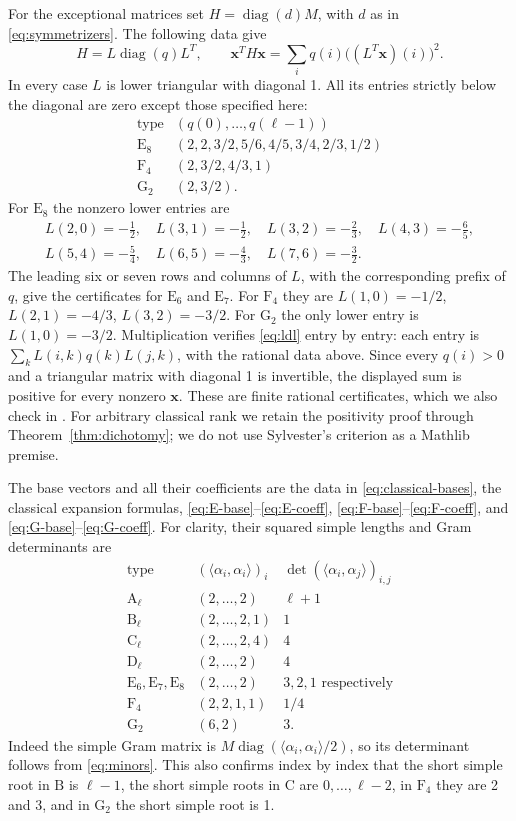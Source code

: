 \documentclass[11pt]{amsart}
\newcommand\Zx{{\mathbf x}}
\newcommand\opk[1]{\mathop{\mathrm{#1}}\nolimits}
\newcommand\ip[2]{\langle#1,#2\rangle}
\theoremstyle{definition}
\newcommand{\typ}[1]{\mathrm{#1}}
\DeclareRobustCommand{\ml}[1]{\ifmmode\text{\normalfont\small\ttfamily\detokenize{#1}}\else{\normalfont\small\nolinkurl{#1}}\fi}
\newcommand{\lsq}[1]{\ip{#1}{#1}}
\begin{document}
For the exceptional matrices set $H=\opk{diag}(d)M$, with $d$ as in
\eqref{eq:symmetrizers}. The following data give
\begin{equation}\label{eq:ldl}
 H=L\opk{diag}(q)L^T,\qquad
 \Zx^TH\Zx=\sum_i q(i)\bigl((L^T\Zx)(i)\bigr)^2.
\end{equation}
In every case $L$ is lower triangular with diagonal 1. All its entries
strictly below the diagonal are zero except those specified here:
\[
\begin{array}{c|l}
\text{type}&(q(0),\ldots,q(\ell-1))\\\hline
\typ E_8&(2,2,3/2,5/6,4/5,3/4,2/3,1/2)\\
\typ F_4&(2,3/2,4/3,1)\\
\typ G_2&(2,3/2).
\end{array}
\]
For $\typ E_8$ the nonzero lower entries are
\[
\begin{gathered}
 L(2,0)=-\tfrac12,\quad L(3,1)=-\tfrac12,\quad
 L(3,2)=-\tfrac23,\quad L(4,3)=-\tfrac65,\\
 L(5,4)=-\tfrac54,\quad L(6,5)=-\tfrac43,\quad
 L(7,6)=-\tfrac32.
\end{gathered}
\]
The leading six or seven rows and columns of $L$, with the corresponding
prefix of $q$, give the certificates for $\typ E_6$ and $\typ E_7$.
For $\typ F_4$ they are
$L(1,0)=-1/2$, $L(2,1)=-4/3$, $L(3,2)=-3/2$.
For $\typ G_2$ the only lower entry is $L(1,0)=-3/2$.
Multiplication verifies \eqref{eq:ldl} entry by entry: each entry is
$\sum_k L(i,k)q(k)L(j,k)$, with the rational data above. Since every
$q(i)>0$ and a triangular matrix with diagonal 1 is invertible,
the displayed sum is positive for every nonzero $\Zx$.
These are finite rational certificates, which we also check in
\ml{checks/affine.py}. For arbitrary classical rank we retain the
positivity proof through Theorem~\ref{thm:dichotomy}; we do not use
Sylvester's criterion as a Mathlib premise.

The base vectors and all their coefficients are the data in
\eqref{eq:classical-bases}, the classical expansion formulas,
\eqref{eq:E-base}--\eqref{eq:E-coeff},
\eqref{eq:F-base}--\eqref{eq:F-coeff}, and
\eqref{eq:G-base}--\eqref{eq:G-coeff}. For clarity, their squared simple
lengths and Gram determinants are
\[
\begin{array}{c|c|c}
\text{type}&(\lsq{\alpha_i})_i&\det(\ip{\alpha_i}{\alpha_j})_{i,j}\\\hline
\typ A_\ell&(2,\ldots,2)&\ell+1\\
\typ B_\ell&(2,\ldots,2,1)&1\\
\typ C_\ell&(2,\ldots,2,4)&4\\
\typ D_\ell&(2,\ldots,2)&4\\
\typ E_6,\typ E_7,\typ E_8&(2,\ldots,2)&3,2,1\text{ respectively}\\
\typ F_4&(2,2,1,1)&1/4\\
\typ G_2&(6,2)&3.
\end{array}
\]
Indeed the simple Gram matrix is
$M\opk{diag}(\lsq{\alpha_i}/2)$, so its determinant follows from
\eqref{eq:minors}. This also confirms index by index that the short
simple root in $\typ B$ is $\ell-1$, the short simple roots in
$\typ C$ are $0,\ldots,\ell-2$, in $\typ F_4$ they are 2 and 3,
and in $\typ G_2$ the short simple root is 1.
\end{document}
